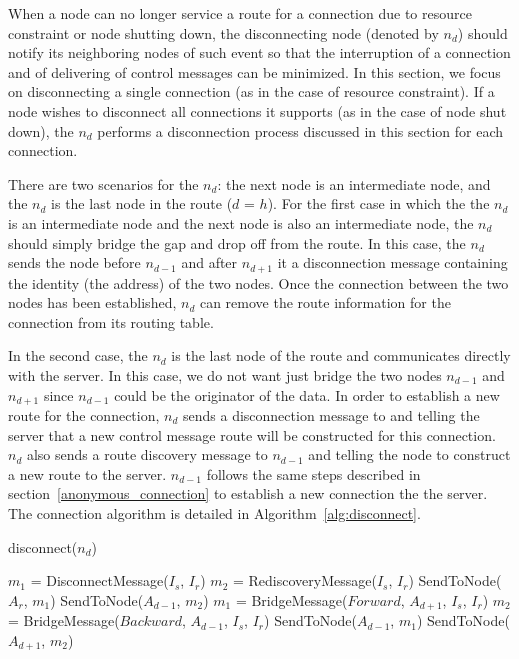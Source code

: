 When a node can no longer service a route for a connection due to
resource constraint or node shutting down, the disconnecting node (denoted
by $n_d$)
should notify its neighboring nodes of such event so that the interruption
of a connection and of delivering of control messages can be minimized.
In this section, we focus on disconnecting a single connection (as in
the case of resource constraint). If a node wishes to disconnect all
connections it supports (as in the case of node shut down), the $n_d$
performs a disconnection process discussed in this section for each
connection.

There are two scenarios for the $n_d$: the next node is an intermediate node,
and the $n_d$ is the last node in the route ($d$ = $h$).
For the first case in which the the $n_d$ is an intermediate node and the
next node is also an intermediate node, the $n_d$ should simply bridge the
gap and drop off from the route. In this case, the $n_d$ sends the node before
$n_{d-1}$
and after $n_{d+1}$
it a disconnection message containing the identity (the address)
of the two nodes. Once the connection between the two nodes has been
established, $n_d$ can remove the route information for the connection
from its routing table.

In the second case, the $n_d$ is the last node of the route and
communicates directly with the server. In this case, we do not want
just bridge the two nodes $n_{d-1}$ and $n_{d+1}$ since $n_{d-1}$
could be the originator of the data. In order to establish a new route
for the connection, $n_d$ sends a disconnection message to and telling
the server that a new control message route will be constructed for this
connection. $n_d$ also sends a route discovery message to $n_{d-1}$
and telling the node to construct a new route to the server. $n_{d-1}$
follows the same steps described in section~\ref{anonymous_connection}
to establish a new connection the the server. The connection algorithm
is detailed in Algorithm~\ref{alg:disconnect}.

\begin{algorithm}
\caption{disconnect($n_d$)} \label{alg:disconnect}
\begin{algorithmic}[1]
    \STATE $m_1$ = DisconnectMessage($I_s$, $I_r$)
    \STATE $m_2$ = RediscoveryMessage($I_s$, $I_r$)
    \STATE SendToNode($A_r$, $m_1$)
    \STATE SendToNode($A_{d-1}$, $m_2$)
\ELSE
    \STATE $m_1$ = BridgeMessage($Forward$, $A_{d+1}$, $I_s$, $I_r$)
    \STATE $m_2$ = BridgeMessage($Backward$, $A_{d-1}$, $I_s$, $I_r$)
    \STATE SendToNode($A_{d-1}$, $m_1$)
    \STATE SendToNode($A_{d+1}$, $m_2$)
\ENDIF
\end{algorithmic}
\end{algorithm}

